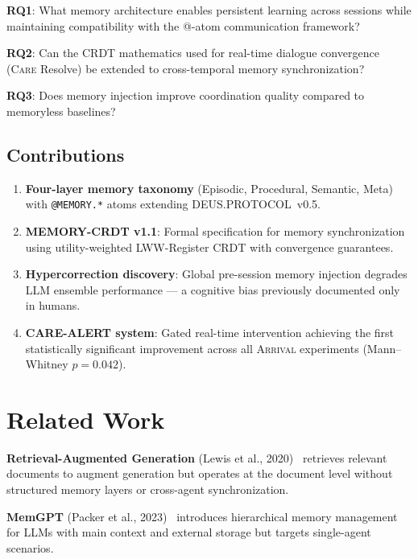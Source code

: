 \documentclass[11pt,a4paper]{article}
\newcommand{\arrival}{\textsc{Arrival}\xspace}
\newcommand{\care}{\textsc{Care}\xspace}
\begin{document}
\textbf{RQ1}: What memory architecture enables persistent learning
across sessions while maintaining compatibility with the @-atom
communication framework?

\textbf{RQ2}: Can the CRDT mathematics used for real-time dialogue
convergence (\care Resolve) be extended to cross-temporal memory
synchronization?

\textbf{RQ3}: Does memory injection improve coordination quality
compared to memoryless baselines?

\subsection{Contributions}

\begin{enumerate}
  \item \textbf{Four-layer memory taxonomy} (Episodic, Procedural,
    Semantic, Meta) with \texttt{@MEMORY.*} atoms extending
    DEUS.PROTOCOL~v0.5.
  \item \textbf{MEMORY-CRDT v1.1}: Formal specification for memory
    synchronization using utility-weighted LWW-Register CRDT with
    convergence guarantees.
  \item \textbf{Hypercorrection discovery}: Global pre-session memory
    injection degrades LLM ensemble performance --- a cognitive bias
    previously documented only in humans.
  \item \textbf{CARE-ALERT system}: Gated real-time intervention
    achieving the first statistically significant improvement across
    all \arrival experiments (Mann--Whitney $p = 0.042$).
\end{enumerate}

\section{Related Work}\label{sec:related}

\textbf{Retrieval-Augmented Generation} (Lewis et al.,
2020)~\cite{lewis2020rag} retrieves relevant documents to augment
generation but operates at the document level without structured memory
layers or cross-agent synchronization.

\textbf{MemGPT} (Packer et al., 2023)~\cite{packer2023memgpt}
introduces hierarchical memory management for LLMs with main context
and external storage but targets single-agent scenarios.
\end{document}

